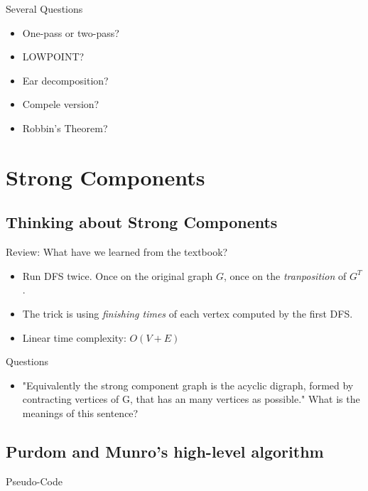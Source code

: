 \documentclass{beamer}
\begin{document}
\begin{frame}{Several Questions}
	\begin{itemize}
		\item
		One-pass or two-pass?
		\item
		LOWPOINT?
		\item
		Ear decomposition?
		\item
		Compele version?
		\item
		Robbin's Theorem?
	\end{itemize}
\end{frame}

\section{Strong Components}

\subsection{Thinking about Strong Components}

\begin{frame}{Review: What have we learned from the textbook?}
	\begin{itemize}
		\item
		Run DFS twice. Once on the original graph $G$, once on the \emph{tranposition} of $G^T$.
		\item
		The trick is using \emph{finishing times} of each vertex computed by the first DFS.
		\item
		Linear time complexity: $O(V+E)$
	\end{itemize}
\end{frame}

\begin{frame}{Questions}
	\begin{itemize}
		\item
		"Equivalently the strong component graph is the acyclic digraph,
		formed by contracting vertices of G, that has an many vertices as possible."
		What is the meanings of this sentence?
	\end{itemize}
\end{frame}

\subsection{Purdom and Munro's high-level algorithm}

\begin{frame}{Pseudo-Code}%
	\mycodea
\end{frame}
\end{document}
